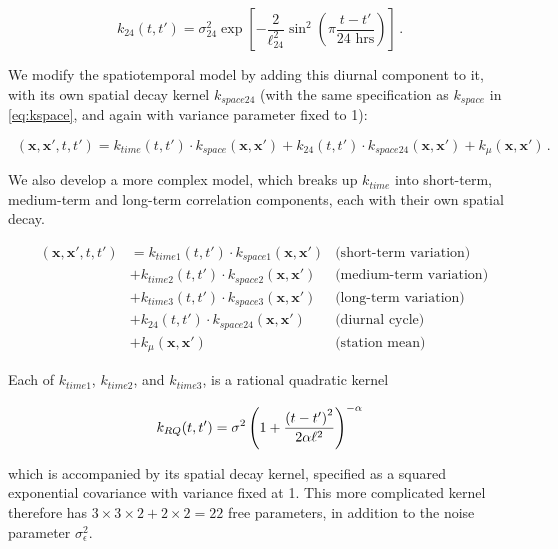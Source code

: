 \documentclass[letter]{article}
\newcommand{\genericdel}[3]{%
      \left#1#3\right#2
    }
\newcommand{\del}[1]{\genericdel(){#1}}
\newcommand{\sbr}[1]{\genericdel[]{#1}}
\newcommand{\xvec}{\mathbold{x}}
\newcommand{\sigman}{\sigma_{\epsilon}}
\DeclareMathOperator{\kdiurn}{k_{\mathtt{SESE_{24}}}}
\DeclareMathOperator{\ksumprod}{k_{\mathtt{sumprod}}}
\newcommand{\eqlabel}[1]{\label{#1}}
\begin{document}
\begin{equation}
    k_{24}(t,t') = \sigma_{24}^2 \exp\sbr{ - \frac{2}{\ell_{24}^2} \sin^2\del{
        \pi \frac{t-t'}{\text{24 hrs}} 
        }}\,.
\end{equation}

We modify the spatiotemporal model by adding this diurnal component to it, with its own spatial decay kernel \(k_{space24}\) (with the same specification as \(k_{space}\) in \eqref{eq:kspace}, and again with variance parameter fixed to 1):

\begin{equation}
    \kdiurn(\xvec,\xvec',t,t') = k_{time}(t,t') \cdot k_{space}(\xvec, \xvec') 
        + k_{24}(t,t') \cdot k_{space24}(\xvec, \xvec')
        + k_\mu(\xvec, \xvec') 
        \,.
\end{equation}
    


        We also develop a more complex model, which breaks up \(k_{time}\) into short-term, medium-term and long-term correlation components, each with their own spatial decay.

\begin{equation}
\eqlabel{eq:sumprod_kernel}
\begin{aligned}
    \ksumprod(\xvec,\xvec',t,t') &= 
           k_{time1}(t,t') \cdot k_{space1}(\xvec, \xvec')  &\text{(short-term variation)} \\
        &+ k_{time2}(t,t') \cdot k_{space2}(\xvec, \xvec')  &\text{(medium-term variation)} \\
        &+ k_{time3}(t,t') \cdot k_{space3}(\xvec, \xvec')  &\text{(long-term variation)} \\
        &+ k_{24}(t,t') \cdot k_{space24}(\xvec, \xvec') &\text{(diurnal cycle)} \\
        &+ k_\mu(\xvec, \xvec') &\text{(station mean)}
\end{aligned}
\end{equation}

Each of \(k_{time1}\), \(k_{time2}\), and \(k_{time3}\), is a rational quadratic kernel

\begin{equation}
    k_{RQ}(t,t') = \sigma^2 \del{1 + \frac{\del{t-t'}^2}{2\alpha\ell^2} }^{-\alpha}
\end{equation}

which is accompanied by its spatial decay kernel, specified as a squared exponential covariance with variance fixed at 1.
This more complicated kernel therefore has \(3 \times 3 \times 2 + 2 \times 2 = 22\) free parameters, in addition to the noise parameter \(\sigman^2\).
\end{document}
